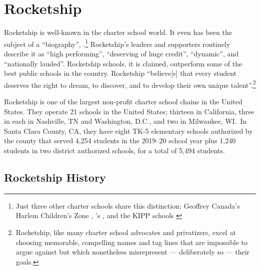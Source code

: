 \section{Rocketship}\label{sec:rocketship}\indent

Rocketship is well-known in the charter school world. It even has been the subject of a ``biography'',  \parencite{Whitmire2014}.\footnote{Just three other charter schools share this distinction: Geoffrey Canada's Harlem Children's Zone \parencite{Tough2009}, \citeauthor{Jacobs2007}'s , and the KIPP schools \parencite{Mathews2009, Horn2016}}  Rocketship's leaders and supporters routinely describe it as ``high performing'', ``deserving of huge credit'', ``dynamic'', and ``nationally lauded''. Rocketship schools, it is claimed, outperform some of the best public schools in the country. Rocketship ``believe[s] that every student deserves the right to dream, to discover, and to develop their own unique talent''.\footnote{Rocketship, like many charter school advocates and privatizers, excel at choosing memorable, compelling names and tag lines that are impossible to argue against but which nonetheless misrepresent — deliberately so — their goals.}

Rocketship is one of the largest non-profit charter school chains in the United States. They operate 21 schools in the United States; thirteen in California, three in each in Nashville, TN and Washington, D.C., and two in Milwaukee, WI.~In Santa Clara County, CA, they have eight TK-5 elementary schools authorized by the county that served 4,254 students in the 2019–20 school year plus 1,240 students in two district authorized schools, for a total of 5,494 students.

\subsection{Rocketship History}\label{sec:history}\indent


